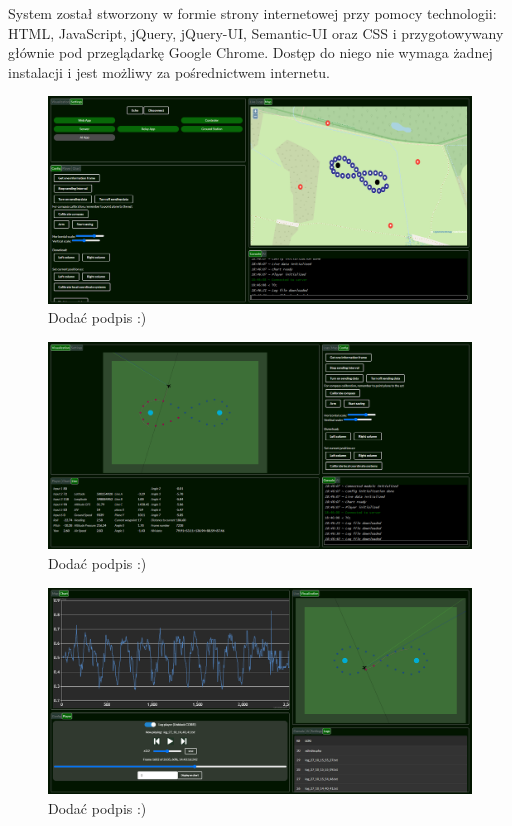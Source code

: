 \documentclass[12pt, a4paper]{article}
\begin{document}
System został stworzony w formie strony internetowej przy pomocy technologii: HTML, JavaScript, jQuery, jQuery-UI, Semantic-UI oraz CSS i przygotowywany głównie pod przeglądarkę Google Chrome. Dostęp do niego nie wymaga żadnej instalacji i jest możliwy za pośrednictwem internetu. 


 \begin{figure}[ht]
    \centering
    \includegraphics[width=1\textwidth]{przedlotem}
    \caption{Dodać podpis :)}
\end{figure}

 \begin{figure}[ht]
    \centering
    \includegraphics[width=1\textwidth]{podczaslotu}
    \caption{Dodać podpis :)}
\end{figure}

 \begin{figure}[ht]
    \centering
    \includegraphics[width=1\textwidth]{polocie}
    \caption{Dodać podpis :)}
\end{figure}
\end{document}
